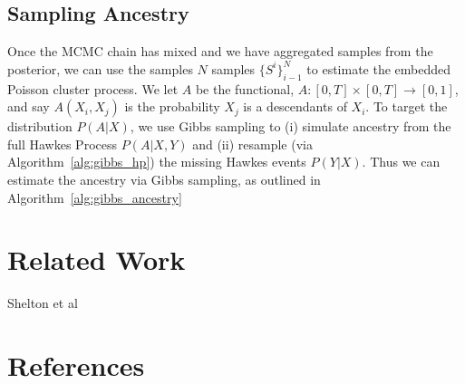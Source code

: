 \documentclass[11pt]{article}
\newcommand{\algrule}[1][.2pt]{\par\vskip.5\baselineskip\hrule height #1\par\vskip.5\baselineskip}
\begin{document}
\subsection{Sampling Ancestry}

Once the MCMC chain has mixed and we have aggregated samples from the posterior, we can use the samples $N$ samples $\{S^i\}_{i-1}^N$ to estimate the embedded Poisson cluster process. We let $A$ be the functional, $A:[0,T]\times[0,T] \to [0,1]$, and say $A(X_i,X_j) $ is the probability $X_j$ is a descendants of $X_i$. To target the distribution $P(A | X)$, we use Gibbs sampling to (i) simulate ancestry from the full Hawkes Process $P(A | X, Y)$ and (ii) resample (via Algorithm~\ref{alg:gibbs_hp}) the missing Hawkes events $P(Y | X)$. Thus we can estimate the ancestry via Gibbs sampling, as outlined in Algorithm~\ref{alg:gibbs_ancestry}







\newpage
\section*{Related Work}

Shelton et al~\cite{AAAI1816985}


\newpage
\section*{References}


\end{document}
